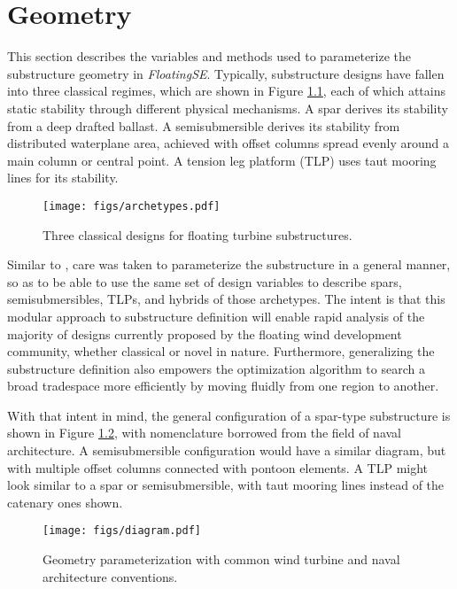 \chapter{Geometry}
\label{sec:geom}
This section describes the variables and methods used to parameterize
the substructure geometry in \textit{FloatingSE}.  Typically,
substructure designs have fallen into three classical regimes, which are
shown in Figure \ref{fig:archetype}, each of which attains static stability
through different physical mechanisms.  A spar derives its stability from a
deep drafted ballast.  A semisubmersible derives its stability from
distributed waterplane area, achieved with offset columns spread evenly
around a main column or central point.  A tension leg platform (TLP) uses taut
mooring lines for its stability.

\begin{figure}[htbp]
  \begin{center}
    \texttt{[image: figs/archetypes.pdf]}
    \caption{Three classical designs for floating turbine substructures.}
    \label{fig:archetype}
  \end{center}
\end{figure}

Similar to \citet{karimi2017}, care was taken to parameterize the
substructure in a general manner, so as to be able to use the same set
of design variables to describe spars, semisubmersibles, TLPs, and
hybrids of those archetypes.  The intent is that this modular approach
to substructure definition will enable rapid analysis of the majority of
designs currently proposed by the floating wind development community,
whether classical or novel in nature.  Furthermore, generalizing the
substructure definition also empowers the optimization algorithm to
search a broad tradespace more efficiently by moving fluidly from one
region to another.

With that intent in mind, the general configuration of a spar-type
substructure is shown in Figure \ref{fig:diagram}, with nomenclature
borrowed from the field of naval architecture.  A semisubmersible
configuration would have a similar diagram, but with multiple offset
columns connected with pontoon elements.  A TLP might look similar to a
spar or semisubmersible, with taut mooring lines instead of the catenary
ones shown.

\begin{figure}[htb]
  \begin{center}
    \texttt{[image: figs/diagram.pdf]}
    \caption{Geometry parameterization with common wind turbine and
      naval architecture conventions.}
    \label{fig:diagram}
  \end{center}
\end{figure}

